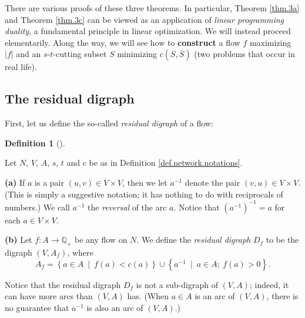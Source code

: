 \documentclass[numbers=enddot,12pt,final,onecolumn,notitlepage]{scrartcl}%
\theoremstyle{definition}
\newtheorem{defi}[theo]{Definition}
\newenvironment{definition}[1][]
{\begin{defi}[#1]\begin{leftbar}}
{\end{leftbar}\end{defi}}
\begin{document}
There are various proofs of these three theorems. In particular, Theorem
\ref{thm.3a} and Theorem \ref{thm.3c} can be viewed as an application of
\textit{linear programming duality}, a fundamental principle in linear
optimization. We will instead proceed elementarily. Along the way, we will see
how to \textbf{construct} a flow $f$ maximizing $\left\vert f\right\vert $ and
an $s$-$t$-cutting subset $S$ minimizing $c\left(  S,\overline{S}\right)  $
(two problems that occur in real life).

\subsection{The residual digraph}

First, let us define the so-called \textit{residual digraph} of a flow:

\begin{definition}
\label{def.Df}Let $N$, $V$, $A$, $s$, $t$ and $c$ be as in Definition
\ref{def.network.notations}.

\textbf{(a)} If $a$ is a pair $\left(  u,v\right)  \in V\times V$, then we let
$a^{-1}$ denote the pair $\left(  v,u\right)  \in V\times V$. (This is simply
a suggestive notation; it has nothing to do with reciprocals of numbers.) We
call $a^{-1}$ the \textit{reversal} of the arc $a$. Notice that $\left(
a^{-1}\right)  ^{-1}=a$ for each $a\in V\times V$.

\textbf{(b)} Let $f:A\rightarrow\mathbb{Q}_{+}$ be any flow on $N$. We define
the \textit{residual digraph }$D_{f}$ to be the digraph $\left(
V,A_{f}\right)  $, where%
\[
A_{f}=\left\{  a\in A\ \mid\ f\left(  a\right)  <c\left(  a\right)  \right\}
\cup\left\{  a^{-1}\ \mid\ a\in A;\ f\left(  a\right)  >0\right\}  .
\]

\end{definition}

Notice that the residual digraph $D_{f}$ is not a sub-digraph of $\left(
V,A\right)  $; indeed, it can have more arcs than $\left(  V,A\right)  $ has.
(When $a\in A$ is an arc of $\left(  V,A\right)  $, there is no guarantee that
$a^{-1}$ is also an arc of $\left(  V,A\right)  $.)
\end{document}
